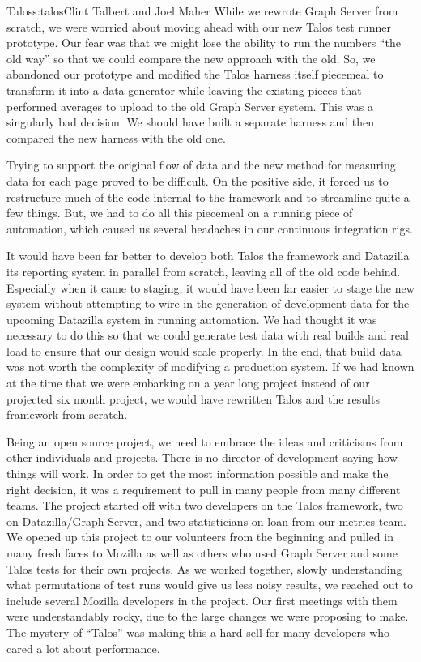 \begin{aosachapter}{Talos}{s:talos}{Clint Talbert and Joel Maher}
While we rewrote Graph Server from scratch, we were worried about moving
ahead with our new Talos test runner prototype. Our fear was that we
might lose the ability to run the numbers ``the old way'' so that we
could compare the new approach with the old. So, we abandoned our
prototype and modified the Talos harness itself piecemeal to transform
it into a data generator while leaving the existing pieces that
performed averages to upload to the old Graph Server system. This was a
singularly bad decision. We should have built a separate harness and
then compared the new harness with the old one.

Trying to support the original flow of data and the new method for
measuring data for each page proved to be difficult. On the positive
side, it forced us to restructure much of the code internal to the
framework and to streamline quite a few things. But, we had to do all
this piecemeal on a running piece of automation, which caused us several
headaches in our continuous integration rigs.

It would have been far better to develop both Talos the framework and
Datazilla its reporting system in parallel from scratch, leaving all of
the old code behind. Especially when it came to staging, it would have
been far easier to stage the new system without attempting to wire in
the generation of development data for the upcoming Datazilla system in
running automation. We had thought it was necessary to do this so that
we could generate test data with real builds and real load to ensure
that our design would scale properly. In the end, that build data was
not worth the complexity of modifying a production system. If we had
known at the time that we were embarking on a year long project instead
of our projected six month project, we would have rewritten Talos and
the results framework from scratch.


Being an open source project, we need to embrace the ideas and
criticisms from other individuals and projects. There is no director of
development saying how things will work. In order to get the most
information possible and make the right decision, it was a requirement
to pull in many people from many different teams. The project started
off with two developers on the Talos framework, two on Datazilla/Graph
Server, and two statisticians on loan from our metrics team. We opened
up this project to our volunteers from the beginning and pulled in many
fresh faces to Mozilla as well as others who used Graph Server and some
Talos tests for their own projects. As we worked together, slowly
understanding what permutations of test runs would give us less noisy
results, we reached out to include several Mozilla developers in the
project. Our first meetings with them were understandably rocky, due to
the large changes we were proposing to make. The mystery of ``Talos''
was making this a hard sell for many developers who cared a lot about
performance.


\end{aosachapter}
